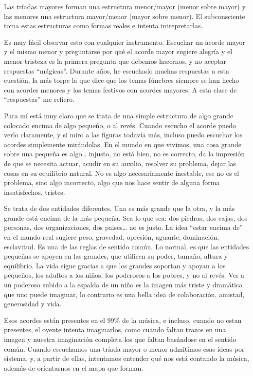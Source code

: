 \documentclass[]{report}
\begin{document}
Las tríadas mayores forman una estructura menor/mayor (menor sobre mayor) y las menores una estructura mayor/menor (mayor sobre menor). El subconsciente toma estas estructuras como formas reales e intenta intrepretarlas.

Es muy fácil observar esto con cualquier instrumento. Escuchar un acorde mayor y el mismo menor y preguntarse por qué el acorde mayor sugiere alegría y el menor tristeza es la primera pregunta que debemos hacernos, y no aceptar respuestas ``mágicas''. Durante años, he escuchado muchas respuestas a esta cuestión, la más torpe la que dice que los temas fúnebres siempre se han hecho con acordes menores y los temas festivos con acordes mayores. A esta clase de ``respuestas'' me refiero.

Para mí está muy claro que se trata de una simple estructura de algo grande colocado encima de algo pequeño, o al revés. Cuando escucho el acorde puedo verlo claramente, y si miro a las figuras todavía más, incluso puedo escuchar los acordes simplemente mirándolas. En el mundo en que vivimos, una cosa grande sobre una pequeña es algo\ldots{} injusto, no está bien, no es correcto, da la impresión de que se necesita actuar, acudir en su auxilio, resolver su problema, dejar las cosas en su equilibrio natural. No es algo necesariamente inestable, ese no es el problema, sino algo incorrecto, algo que nos hace sentir de alguna forma insatisfechos, tristes.

Se trata de dos entidades diferentes. Una es más grande que la otra, y la más grande está encima de la más pequeña. Sea lo que sea: dos piedras, dos cajas, dos personas, dos organizaciones, dos paises\ldots{} no es justo. La idea ``estar encima de'' en el mundo real sugiere peso, gravedad, opresión, aguante, dominación, esclavitud. Es una de las reglas de sentido común. Lo normal, es que las entidades pequeñas se apoyen en las grandes, que utilicen su poder, tamaño, altura y equilibrio. La vida sigue gracias a que los grandes soportan y apoyan a los pequeños, los adultos a los niños, los poderosos a los pobres, y no al revés. Ver a un poderoso subido a la espalda de un niño es la imagen más triste y dramática que uno puede imaginar, lo contrario es una bella idea de colaboración, amistad, generosidad y vida.

Esos acordes están presentes en el 99\% de la música, e incluso, cuando no estan presentes, el oyente intenta imaginarlos, como cuando faltan trazos en una imagen y nuestra imaginación completa los que faltan basándose en el sentido común. Cuando escuchamos una tríada mayor o menor admitimos esas ideas por sistema, y, a partir de ellas, intentamos entender qué nos está contando la música, además de orientarnos en el mapa que forman.
\end{document}

